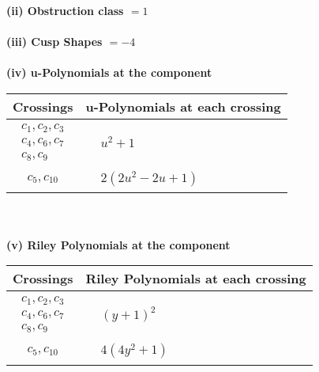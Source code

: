 \documentclass[1p]{elsarticle_modified}
\theoremstyle{definition}
\begin{document}
\flushleft \textbf{(ii) Obstruction class $= 1$}\\~\\
\flushleft \textbf{(iii) Cusp Shapes $= -4$}\\~\\
\newpage\renewcommand{\arraystretch}{1}
\flushleft \textbf{(iv) u-Polynomials at the component}\newline \\
\begin{tabular}{m{50pt}|m{274pt}}
Crossings & \hspace{64pt}u-Polynomials at each crossing \\
\hline $$\begin{aligned}c_{1},c_{2},c_{3}\\c_{4},c_{6},c_{7}\\c_{8},c_{9}\end{aligned}$$&$\begin{aligned}
&u^2+1
\end{aligned}$\\
\hline $$\begin{aligned}c_{5},c_{10}\end{aligned}$$&$\begin{aligned}
&2(2 u^2-2 u+1)
\end{aligned}$\\
\hline
\end{tabular}\\~\\
\newpage\renewcommand{\arraystretch}{1}
\flushleft \textbf{(v) Riley Polynomials at the component}\newline \\
\begin{tabular}{m{50pt}|m{274pt}}
Crossings & \hspace{64pt}Riley Polynomials at each crossing \\
\hline $$\begin{aligned}c_{1},c_{2},c_{3}\\c_{4},c_{6},c_{7}\\c_{8},c_{9}\end{aligned}$$&$\begin{aligned}
&(y+1)^2
\end{aligned}$\\
\hline $$\begin{aligned}c_{5},c_{10}\end{aligned}$$&$\begin{aligned}
&4(4 y^2+1)
\end{aligned}$\\
\hline
\end{tabular}\\~\\
\end{document}
